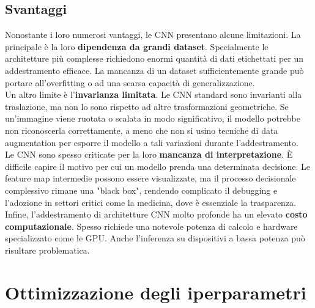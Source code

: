 \documentclass[a4paper,12pt]{report}
\begin{document}
	\section{Svantaggi}
	
	Nonostante i loro numerosi vantaggi, le CNN presentano alcune limitazioni. La principale è la loro \textbf{dipendenza da grandi dataset}. Specialmente le architetture più complesse richiedono enormi quantità di dati etichettati per un addestramento efficace. La mancanza di un dataset sufficientemente grande può portare all'overfitting o ad una scarsa capacità di generalizzazione. \\
	Un altro limite è l'\textbf{invarianza limitata}. Le CNN standard sono invarianti alla traslazione, ma non lo sono rispetto ad altre trasformazioni geometriche. Se un'immagine viene ruotata o scalata in modo significativo, il modello potrebbe non riconoscerla correttamente, a meno che non si usino tecniche di data augmentation per esporre il modello a tali variazioni durante l'addestramento. \\
	Le CNN sono spesso criticate per la loro \textbf{mancanza di interpretazione}. È difficile capire il motivo per cui un modello prenda una determinata decisione. Le feature map intermedie possono essere visualizzate, ma il processo decisionale complessivo rimane una "black box", rendendo complicato il debugging e l'adozione in settori critici come la medicina, dove è essenziale la trasparenza. \\
	Infine, l'addestramento di architetture CNN molto profonde ha un elevato \textbf{costo computazionale}. Spesso richiede una notevole potenza di calcolo e hardware specializzato come le GPU. Anche l'inferenza su dispositivi a bassa potenza può risultare problematica.
	
	\chapter{Ottimizzazione degli iperparametri}
	
\end{document}
